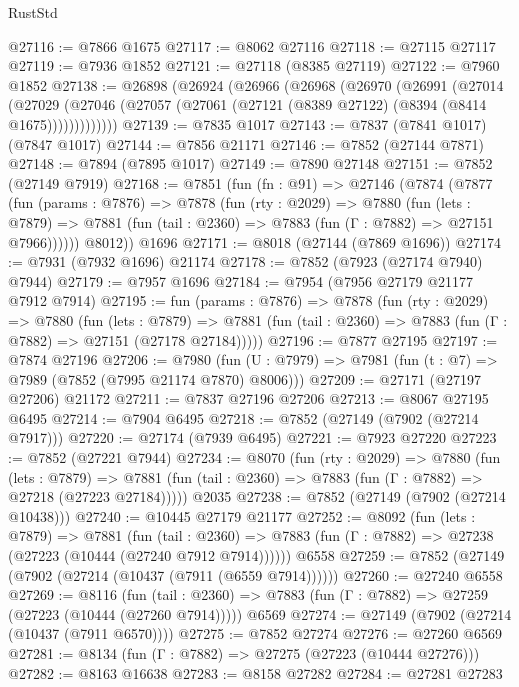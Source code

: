 \begin{lexlean}{RustStd}
\begin{coremodule}
@27116 := @7866 @1675
@27117 := @8062 @27116
@27118 := @27115 @27117
@27119 := @7936 @1852
@27121 := @27118 (@8385 @27119)
@27122 := @7960 @1852
@27138 := @26898
    (@26924
      (@26966
        (@26968
          (@26970
            (@26991
              (@27014
                (@27029
                  (@27046 (@27057 (@27061 (@27121 (@8389 @27122) (@8394 (@8414 @1675)))))))))))))
@27139 := @7835 @1017
@27143 := @7837 (@7841 @1017) (@7847 @1017)
@27144 := @7856 @21171
@27146 := @7852 (@27144 @7871)
@27148 := @7894 (@7895 @1017)
@27149 := @7890 @27148
@27151 := @7852 (@27149 @7919)
@27168 := @7851
    (fun (fn : @91) =>
    @27146
      (@7874
        (@7877
          (fun (params : @7876) =>
          @7878
            (fun (rty : @2029) =>
            @7880
              (fun (lets : @7879) =>
              @7881 (fun (tail : @2360) => @7883 (fun (Γ : @7882) => @27151 @7966))))))
        @8012))
    @1696
@27171 := @8018 (@27144 (@7869 @1696))
@27174 := @7931 (@7932 @1696) @21174
@27178 := @7852 (@7923 (@27174 @7940) @7944)
@27179 := @7957 @1696
@27184 := @7954 (@7956 @27179 @21177 @7912 @7914)
@27195 := fun (params : @7876) =>
  @7878
    (fun (rty : @2029) =>
    @7880
      (fun (lets : @7879) =>
      @7881 (fun (tail : @2360) => @7883 (fun (Γ : @7882) => @27151 (@27178 @27184)))))
@27196 := @7877 @27195
@27197 := @7874 @27196
@27206 := @7980
    (fun (U : @7979) => @7981 (fun (t : @7) => @7989 (@7852 (@7995 @21174 @7870) @8006)))
@27209 := @27171 (@27197 @27206) @21172
@27211 := @7837 @27196 @27206
@27213 := @8067 @27195 @6495
@27214 := @7904 @6495
@27218 := @7852 (@27149 (@7902 (@27214 @7917)))
@27220 := @27174 (@7939 @6495)
@27221 := @7923 @27220
@27223 := @7852 (@27221 @7944)
@27234 := @8070
    (fun (rty : @2029) =>
    @7880
      (fun (lets : @7879) =>
      @7881 (fun (tail : @2360) => @7883 (fun (Γ : @7882) => @27218 (@27223 @27184)))))
    @2035
@27238 := @7852 (@27149 (@7902 (@27214 @10438)))
@27240 := @10445 @27179 @21177
@27252 := @8092
    (fun (lets : @7879) =>
    @7881
      (fun (tail : @2360) =>
      @7883 (fun (Γ : @7882) => @27238 (@27223 (@10444 (@27240 @7912 @7914))))))
    @6558
@27259 := @7852 (@27149 (@7902 (@27214 (@10437 (@7911 (@6559 @7914))))))
@27260 := @27240 @6558
@27269 := @8116
    (fun (tail : @2360) => @7883 (fun (Γ : @7882) => @27259 (@27223 (@10444 (@27260 @7914)))))
    @6569
@27274 := @27149 (@7902 (@27214 (@10437 (@7911 @6570))))
@27275 := @7852 @27274
@27276 := @27260 @6569
@27281 := @8134 (fun (Γ : @7882) => @27275 (@27223 (@10444 @27276)))
@27282 := @8163 @16638
@27283 := @8158 @27282
@27284 := @27281 @27283

\end{coremodule}
\end{lexlean}
